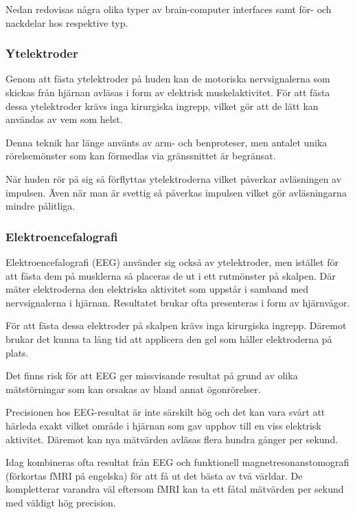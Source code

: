 \documentclass[12pt, a4paper]{article}
\begin{document}
Nedan redovisas några olika typer av brain-computer interfaces samt för- och
nackdelar hos respektive typ.

\subsubsection{Ytelektroder}

Genom att fästa ytelektroder på huden kan de motoriska nervsignalerna som
skickas från hjärnan avläsas i form av elektrisk muskelaktivitet. För att fästa
dessa ytelektroder krävs inga kirurgiska ingrepp, vilket gör att de lätt kan
användas av vem som helst.

Denna teknik har länge använts av arm- och benproteser, men antalet unika
rörelsemönster som kan förmedlas via gränssnittet är begränsat.

När huden rör på sig så förflyttas ytelektroderna vilket påverkar avläsningen av
impulsen. Även när man är svettig så påverkas impulsen vilket gör avläsningarna
mindre pålitliga. \cite{prosthetic_operation}

\subsubsection{Elektroencefalografi}

Elektroencefalografi (EEG) använder sig också av ytelektroder, men istället för
att fästa dem på musklerna så placeras de ut i ett rutmönster på skalpen. Där
mäter elektroderna den elektriska aktivitet som uppstår i samband med
nervsignalerna i hjärnan. Resultatet brukar ofta presenteras i form av
hjärnvågor.

För att fästa dessa elektroder på skalpen krävs inga kirurgiska ingrepp. Däremot
brukar det kunna ta lång tid att applicera den gel som håller elektroderna på
plats.

Det finns risk för att EEG ger missvisande resultat på grund av olika
mätstörningar som kan orsakas av bland annat ögonrörelser.

Precisionen hos EEG-resultat är inte särskilt hög och det kan vara svårt att
härleda exakt vilket område i hjärnan som gav upphov till en viss elektrisk
aktivitet. Däremot kan nya mätvärden avläsas flera hundra gånger per sekund.

Idag kombineras ofta resultat från EEG och funktionell magnetresonanstomografi
(förkortas fMRI på engelska) för att få ut det bästa av två världar. De
kompletterar varandra väl eftersom fMRI kan ta ett fåtal mätvärden per sekund
med väldigt hög precision. \cite{eeg_fmri}
\end{document}
